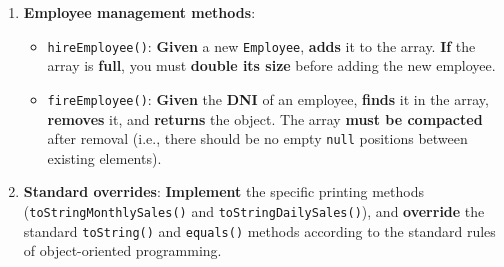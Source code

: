 \begin{enumerate}
\begin{itemize}
            \item \texttt{salesInMonth()}: \textbf{Given} a specific \textbf{month} as an argument, \textbf{returns} the \textbf{sum of sales} for that specific month.

            \item \texttt{topSalesMonth()}: \textbf{Returns} the \textbf{month} (index) with the \textbf{highest volume of sales}. You can use \texttt{salesInMonth()} to compute the values for each month.

            \item \texttt{updateSales()}: \textbf{Overload} this method to provide two different implementations:

                \begin{itemize}

                    \item \textbf{Given} a \textbf{month}, a \textbf{day}, and a \textbf{sale amount}, \textbf{updates} (adds to) the sales amount for the specified date.

                    \item \textbf{Given} \textbf{only} a \textbf{sale amount}, \textbf{updates} the sales amount for the \textbf{current month and day}. \textbf{Note}: the current date is obtained with \texttt{java.time.LocalDate}: \texttt{LocalDate.now().getMonthValue()} gives the month (from \texttt{1} to \texttt{12}) and \texttt{LocalDate.now().getDayOfMonth()} the day (from \texttt{1} to \texttt{31}), after \texttt{import java.time.LocalDate;}.

                \end{itemize}

        \end{itemize}

    \item \textbf{Employee management methods}:

        \begin{itemize}

            \item \texttt{hireEmployee()}: \textbf{Given} a new \texttt{Employee}, \textbf{adds} it to the array. \textbf{If} the array is \textbf{full}, you must \textbf{double its size} before adding the new employee.

            \item \texttt{fireEmployee()}: \textbf{Given} the \textbf{DNI} of an employee, \textbf{finds} it in the array, \textbf{removes} it, and \textbf{returns} the object. The array \textbf{must be compacted} after removal (i.e., there should be no empty \texttt{null} positions between existing elements).

        \end{itemize}

    \item \textbf{Standard overrides}: \textbf{Implement} the specific printing methods (\texttt{toStringMonthlySales()} and \texttt{toStringDailySales()}), and \textbf{override} the standard \texttt{toString()} and \texttt{equals()} methods according to the standard rules of object-oriented programming.

\end{enumerate}

